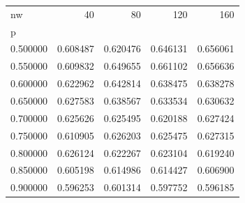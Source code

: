 \begin{tabular}{lrrrr}
\toprule
nw & 40 & 80 & 120 & 160 \\
p &  &  &  &  \\
\midrule
0.500000 & 0.608487 & 0.620476 & 0.646131 & 0.656061 \\
0.550000 & 0.609832 & 0.649655 & 0.661102 & 0.656636 \\
0.600000 & 0.622962 & 0.642814 & 0.638475 & 0.638278 \\
0.650000 & 0.627583 & 0.638567 & 0.633534 & 0.630632 \\
0.700000 & 0.625626 & 0.625495 & 0.620188 & 0.627424 \\
0.750000 & 0.610905 & 0.626203 & 0.625475 & 0.627315 \\
0.800000 & 0.626124 & 0.622267 & 0.623104 & 0.619240 \\
0.850000 & 0.605198 & 0.614986 & 0.614427 & 0.606900 \\
0.900000 & 0.596253 & 0.601314 & 0.597752 & 0.596185 \\
\bottomrule
\end{tabular}
